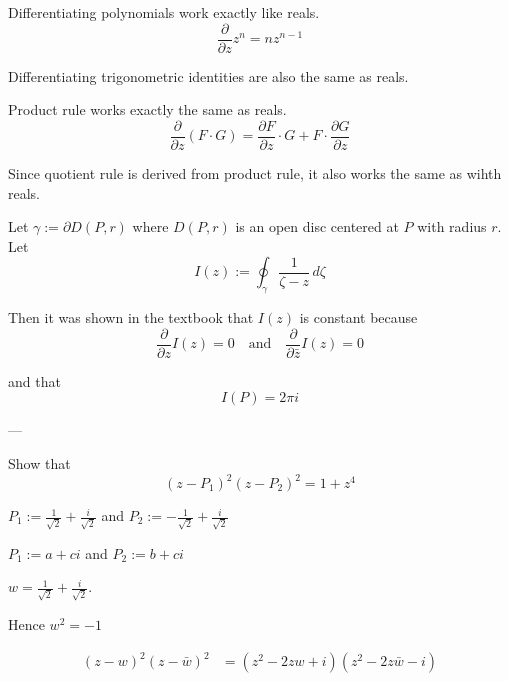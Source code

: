 \def\pp#1#2{\frac{\partial #1}{\partial #2}}

\label{f107aed}

Differentiating polynomials work exactly like reals.
$$
  \pp{}z z^n=nz^{n-1}
$$

Differentiating trigonometric identities are also the same as reals.

Product rule works exactly the same as reals.
$$
  \pp{}z(F\cdot G)=\pp Fz\cdot G+F\cdot\pp Gz
$$

Since quotient rule is derived from product rule, it also works the same as
wihth reals.

\label{fbc836e}

Let $\gamma:=\partial D(P,r)$ where $D(P,r)$ is an open disc centered at $P$
with radius $r$. Let
$$
  I(z):=\oint_\gamma\frac1{\zeta-z}\,d\zeta
$$

Then it was shown in the textbook that $I(z)$ is constant because
$$
  \pp{}zI(z)=0\quad\text{and}\quad\pp{}{\bar z}I(z)=0
$$

and that
$$
  I(P)=2\pi i
$$

---

Show that
$$
  (z-P_1)^2(z-P_2)^2=1+z^4
$$

$P_1:=\frac1{\sqrt2}+\frac i{\sqrt2}$ and $P_2:=-\frac1{\sqrt2}+\frac i{\sqrt2}$

$P_1:=a+ci$ and $P_2:=b+ci$

$w=\frac1{\sqrt2}+\frac i{\sqrt2}$.

Hence $w^2=-1$

\begin{align*}
  (z-w)^2(z-\bar w)^2
   & = (z^2-2zw+i)(z^2-2z\bar w-i) \\
\end{align*}